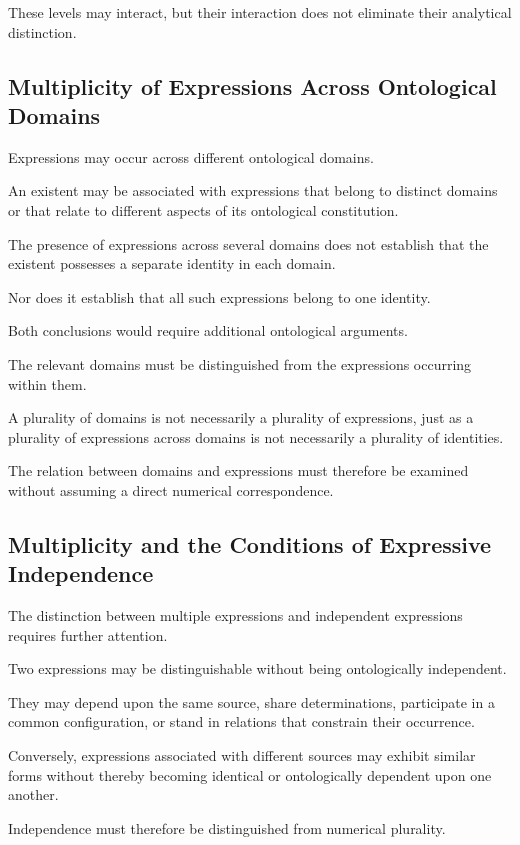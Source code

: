 These levels may interact, but their interaction
does not eliminate their analytical distinction.

\subsection{Multiplicity of Expressions Across Ontological Domains}

Expressions may occur across different
ontological domains.

An existent may be associated with expressions
that belong to distinct domains or that relate
to different aspects of its ontological constitution.

The presence of expressions across several
domains does not establish that the existent
possesses a separate identity in each domain.

Nor does it establish that all such expressions
belong to one identity.

Both conclusions would require additional
ontological arguments.

The relevant domains must be distinguished
from the expressions occurring within them.

A plurality of domains is not necessarily
a plurality of expressions, just as a plurality
of expressions across domains is not necessarily
a plurality of identities.

The relation between domains and expressions
must therefore be examined without assuming
a direct numerical correspondence.

\subsection{Multiplicity and the Conditions of Expressive Independence}

The distinction between multiple expressions
and independent expressions requires further
attention.

Two expressions may be distinguishable without
being ontologically independent.

They may depend upon the same source, share
determinations, participate in a common
configuration, or stand in relations that
constrain their occurrence.

Conversely, expressions associated with
different sources may exhibit similar forms
without thereby becoming identical or
ontologically dependent upon one another.

Independence must therefore be distinguished
from numerical plurality.

